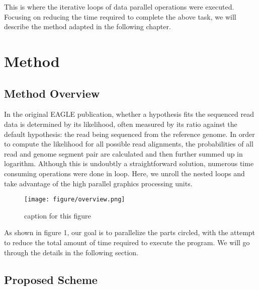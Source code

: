 \documentclass{PHlab-thesis}
\begin{document}
This is where the iterative loops of data parallel operations were executed. Focusing on reducing the time required to complete the above task, we will describe the method adapted in the following chapter.

\chapter{Method}
\section{Method Overview}
In the original EAGLE publication, whether a hypothesis fits the sequenced read data is determined by its likelihood, often measured by its ratio against the default hypothesis: the read being sequenced from the reference genome. In order to compute the likelihood for all possible read alignments, the probabilities of all read and genome segment pair are calculated and then further summed up in logarithm. Although this is undoubtly a straightforward solution, numerous time consuming operations were done in loop. Here, we unroll the nested loops and take advantage of the high parallel graphics processing units. 

\begin{figure}[positioning value]
  \centering
  \texttt{[image: figure/overview.png]}
  \caption{caption for this figure}
  \label{fig:label for this figure}
\end{figure}

As shown in figure 1, our goal is to parallelize the parts circled, with the attempt to reduce the total amount of time required to execute the program. We will go through the details in the following section.

\section{Proposed Scheme}
\end{document}
